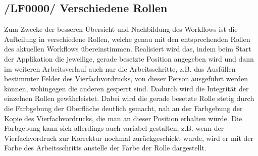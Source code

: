 \subsection{/LF0000/ Verschiedene Rollen}
Zum Zwecke der besseren Übersicht und Nachbildung des Workflows ist die Aufteilung in verschiedene Rollen, welche genau mit den entsprechenden Rollen des aktuellen Workflows übereinstimmen. Realisiert wird das, indem beim Start der Applikation die jeweilige, gerade besetzte Position angegeben wird und dann im weiteren Arbeitsverlauf auch nur die Arbeitsschritte, z.B. das Ausfüllen bestimmter Felder des Vierfachvordrucks, von dieser Person ausgeführt werden können, wohingegen die anderen gesperrt sind. Dadurch wird die Integrität der einzelnen Rollen gewährleistet. Dabei wird die gerade besetzte Rolle stetig durch die Farbgebung der Oberfläche deutlich gemacht, nah an der Farbgebung der Kopie des Vierfachvordrucks, die man an dieser Position erhalten würde. Die Farbgebung kann sich allerdings auch variabel gestalten, z.B. wenn der Vierfachvordruck zur Korrektur nochmal zurückgeschickt wurde, wird er mit der Farbe des Arbeitsschritts anstelle der Farbe der Rolle dargestellt. 
